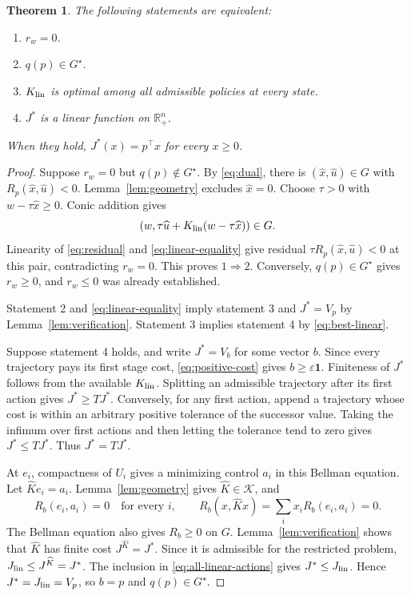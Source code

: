 \documentclass[10pt]{article}
\newtheorem{theorem}{Theorem}
\newcommand{\R}{\mathbb R}
\newcommand{\one}{\mathbf 1}
\begin{document}
\begin{theorem}
\label{thm:exactness}
The following statements are equivalent:
\begin{enumerate}
 \item $r_w=0$.
 \item $q(p)\in G^\star$.
 \item $K_{\rm lin}$ is optimal among all admissible policies at every state.
 \item $J^*$ is a linear function on $\R_+^n$.
\end{enumerate}
When they hold, $J^*(x)=p^\top x$ for every $x\ge0$.
\end{theorem}
\begin{proof}
Suppose $r_w=0$ but $q(p)\notin G^\star$. By \eqref{eq:dual}, there is $(\widehat x,\widehat u)\in G$ with $R_p(\widehat x,\widehat u)<0$. Lemma~\ref{lem:geometry} excludes $\widehat x=0$. Choose $\tau>0$ with $w-\tau\widehat x\ge0$. Conic addition gives
\[
 (w,\tau\widehat u+K_{\rm lin}(w-\tau\widehat x))\in G.
\]
Linearity of \eqref{eq:residual} and \eqref{eq:linear-equality} give residual $\tau R_p(\widehat x,\widehat u)<0$ at this pair, contradicting $r_w=0$. This proves $1\Rightarrow2$. Conversely, $q(p)\in G^\star$ gives $r_w\ge0$, and $r_w\le0$ was already established.

Statement 2 and \eqref{eq:linear-equality} imply statement 3 and $J^*=V_p$ by Lemma~\ref{lem:verification}. Statement 3 implies statement 4 by \eqref{eq:best-linear}.

Suppose statement 4 holds, and write $J^*=V_b$ for some vector $b$. Since every trajectory pays its first stage cost, \eqref{eq:positive-cost} gives $b\ge\varepsilon\one$. Finiteness of $J^*$ follows from the available $K_{\rm lin}$. Splitting an admissible trajectory after its first action gives $J^*\ge TJ^*$. Conversely, for any first action, append a trajectory whose cost is within an arbitrary positive tolerance of the successor value. Taking the infimum over first actions and then letting the tolerance tend to zero gives $J^*\le TJ^*$. Thus $J^*=TJ^*$.

At $e_i$, compactness of $U_i$ gives a minimizing control $a_i$ in this Bellman equation. Let $\widehat K e_i=a_i$. Lemma~\ref{lem:geometry} gives $\widehat K\in\mathcal K$, and
\[
 R_b(e_i,a_i)=0\quad\text{for every }i,
 \qquad R_b(x,\widehat Kx)=\sum_i x_iR_b(e_i,a_i)=0.
\]
The Bellman equation also gives $R_b\ge0$ on $G$. Lemma~\ref{lem:verification} shows that $\widehat K$ has finite cost $J^{\widehat K}=J^*$. Since it is admissible for the restricted problem, $J_{\rm lin}\le J^{\widehat K}=J^*$. The inclusion in \eqref{eq:all-linear-actions} gives $J^*\le J_{\rm lin}$. Hence $J^*=J_{\rm lin}=V_p$, so $b=p$ and $q(p)\in G^\star$.
\end{proof}
\end{document}
